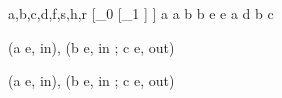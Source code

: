 a,b,c,d,f,s,h,r
[_{0} [_{1} ] ]
a a b b e e
a d b c

(a e, in), (b e, in ; c e, out)

(a e, in), (b e, in ; c e, out)